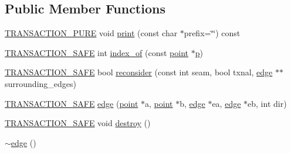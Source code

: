 \subsection*{Public Member Functions}
\begin{DoxyCompactItemize}
\item 
\hyperlink{common_8hpp_aad0b6a771c65df7f474192857172ee3e}{T\-R\-A\-N\-S\-A\-C\-T\-I\-O\-N\-\_\-\-P\-U\-R\-E} void \hyperlink{classedge_a67b4470d9fae58c63a3a63765880cf58}{print} (const char $\ast$prefix=\char`\"{}\char`\"{}) const 
\item 
\hyperlink{common_8hpp_a77872cb9748b204f4b1c44ba6141b862}{T\-R\-A\-N\-S\-A\-C\-T\-I\-O\-N\-\_\-\-S\-A\-F\-E} int \hyperlink{classedge_a528535c93e864fea104ca95de447b198}{index\-\_\-of} (const \hyperlink{classpoint}{point} $\ast$\hyperlink{counted__ptr_8hpp_a5c9f59d7c24e3fd6ceae319a968fc3e0}{p})
\item 
\hyperlink{common_8hpp_a77872cb9748b204f4b1c44ba6141b862}{T\-R\-A\-N\-S\-A\-C\-T\-I\-O\-N\-\_\-\-S\-A\-F\-E} bool \hyperlink{classedge_aad0f6a205dbe62d5f1bc564cb66cd9e8}{reconsider} (const int seam, bool txnal, \hyperlink{classedge}{edge} $\ast$$\ast$surrounding\-\_\-edges)
\item 
\hyperlink{common_8hpp_a77872cb9748b204f4b1c44ba6141b862}{T\-R\-A\-N\-S\-A\-C\-T\-I\-O\-N\-\_\-\-S\-A\-F\-E} \hyperlink{classedge_a7e12d7aa8446beb4e11910ebcb442de2}{edge} (\hyperlink{classpoint}{point} $\ast$a, \hyperlink{classpoint}{point} $\ast$b, \hyperlink{classedge}{edge} $\ast$ea, \hyperlink{classedge}{edge} $\ast$eb, int dir)
\item 
\hyperlink{common_8hpp_a77872cb9748b204f4b1c44ba6141b862}{T\-R\-A\-N\-S\-A\-C\-T\-I\-O\-N\-\_\-\-S\-A\-F\-E} void \hyperlink{classedge_a17a50641ad92dce62c3c8db8bf528ddc}{destroy} ()
\item 
\hyperlink{classedge_a6295b7f8e62fa95cd887fb78d64347f5}{$\sim$edge} ()
\end{DoxyCompactItemize}
